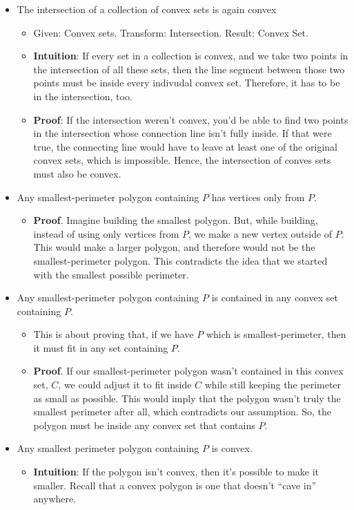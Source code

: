 \begin{itemize}
	\item The intersection of a collection of convex sets is again convex
	      \begin{itemize}
		      \item Given: Convex sets. Transform: Intersection. Result: Convex Set.
		      \item \textbf{Intuition}: If every set in a collection is convex, and we take two points in the intersection of all these sets, then the line segment between those two points must be inside every indivudal convex set. Therefore, it has to be in the intersection, too.
		      \item \textbf{Proof}: If the intersection weren't convex, you'd be able to find two points in the intersection whose connection line isn't fully inside. If that were true, the connecting line would have to leave at least one of the original convex sets, which is impossible. Hence, the intersection of conves sets must also be convex.
	      \end{itemize}
	\item Any smallest-perimeter polygon containing $P$ has vertices only from $P$.
	      \begin{itemize}
		      \item \textbf{Proof}. Imagine building the smallest polygon. But, while building, instead of using only vertices from $P$, we make a new vertex outside of $P$. This would make a larger polygon, and therefore would not be the smallest-perimeter polygon. This contradicts the idea that we started with the smallest possible perimeter.
	      \end{itemize}
	\item Any smallest-perimeter polygon containing $P$ is contained in any convex set containing $P$.
	      \begin{itemize}
		      \item This is about proving that, if we have $P$ which is smallest-perimeter, then it must fit in any set containing $P$.
		      \item \textbf{Proof}. If our smallest-perimeter polygon wasn't contained in this convex set, $C$, we could adjust it to fit inside $C$ while still keeping the perimeter as small as possible. This would imply that the polygon wasn't truly the smallest perimeter after all, which contradicts our assumption. So, the polygon must be inside any convex set that contains $P$.
	      \end{itemize}
	\item Any smallest perimeter polygon containing $P$ is convex.
	      \begin{itemize}
		      \item \textbf{Intuition}: If the polygon isn't convex, then it's possible to make it smaller. Recall that a convex polygon is one that doesn't ``cave in'' anywhere.


\end{itemize}
\end{itemize}
